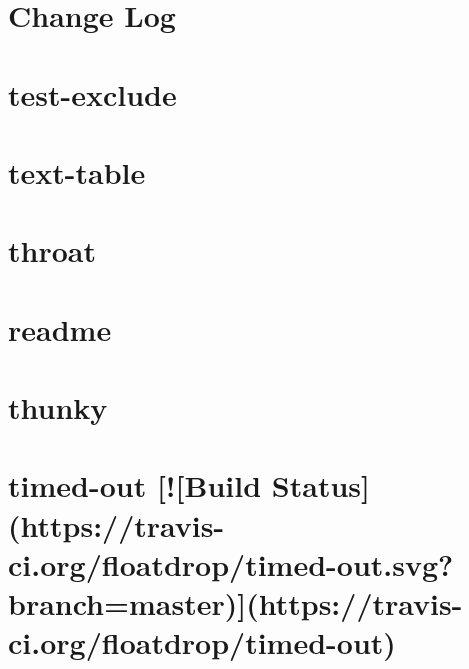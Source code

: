 \documentclass[twoside]{book}
\newcommand{\+}{\discretionary{\mbox{\scriptsize$\hookleftarrow$}}{}{}}
\begin{document}
\chapter{Change Log}
\label{md__c_1_workspace_demo_src_main_script_node_modules_test-exclude__c_h_a_n_g_e_l_o_g}

\chapter{test-\/exclude}
\label{md__c_1_workspace_demo_src_main_script_node_modules_test-exclude__r_e_a_d_m_e}

\chapter{text-\/table}
\label{md__c_1_workspace_demo_src_main_script_node_modules_text-table_readme}

\chapter{throat}
\label{md__c_1_workspace_demo_src_main_script_node_modules_throat__r_e_a_d_m_e}

\chapter{readme}
\label{md__c_1_workspace_demo_src_main_script_node_modules_through_readme}

\chapter{thunky}
\label{md__c_1_workspace_demo_src_main_script_node_modules_thunky__r_e_a_d_m_e}

\chapter{timed-\/out \mbox{[}!\mbox{[}Build Status\mbox{]}(https\+://travis-\/ci.org/floatdrop/timed-\/out.svg?branch=master)\mbox{]}(https\+://travis-\/ci.org/floatdrop/timed-\/out)}
\label{md__c_1_workspace_demo_src_main_script_node_modules_timed-out_readme}

\end{document}
